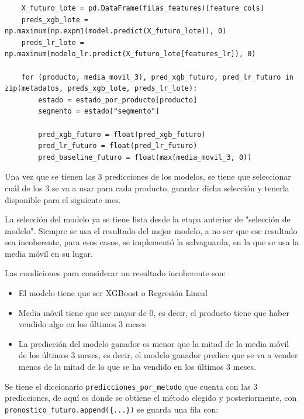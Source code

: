 \label{lst:prediccion_lote_futuro}
\begin{verbatim}
    X_futuro_lote = pd.DataFrame(filas_features)[feature_cols]
    preds_xgb_lote = np.maximum(np.expm1(model.predict(X_futuro_lote)), 0)
    preds_lr_lote = np.maximum(modelo_lr.predict(X_futuro_lote[features_lr]), 0)

    for (producto, media_movil_3), pred_xgb_futuro, pred_lr_futuro in zip(metadatos, preds_xgb_lote, preds_lr_lote):
        estado = estado_por_producto[producto]
        segmento = estado["segmento"]

        pred_xgb_futuro = float(pred_xgb_futuro)
        pred_lr_futuro = float(pred_lr_futuro)
        pred_baseline_futuro = float(max(media_movil_3, 0))
\end{verbatim}

Una vez que se tienen las 3 predicciones de los modelos, se tiene que seleccionar cuál de los 3 se va a usar para cada producto, guardar dicha selección y tenerla disponible para el siguiente mes. 

La selección del modelo ya se tiene lista desde la etapa anterior de "selección de modelo". Siempre se usa el resultado del mejor modelo, a no ser que ese resultado sea incoherente, para esos casos, se implementó la salvaguarda, en la que se usa la media móvil en su lugar.

Las condiciones para considerar un resultado incoherente son:

\begin{itemize}
    \item El modelo tiene que ser XGBoost o Regresión Lineal
    \item Media móvil tiene que ser mayor de 0, es decir, el producto tiene que haber vendido algo en los últimos 3 meses
    \item La predicción del modelo ganador es menor que la mitad de la media móvil de los últimos 3 meses, es decir, el modelo ganador predice que se va a vender menos de la mitad de lo que se ha vendido en los últimos 3 meses.
\end{itemize}

Se tiene el diccionario \texttt{predicciones\_por\_metodo} que cuenta con las 3 predicciones, de aquí es donde se obtiene el método elegido y posteriormente, con \texttt{pronostico\_futuro.append(\{...\})} se guarda una fila con:

